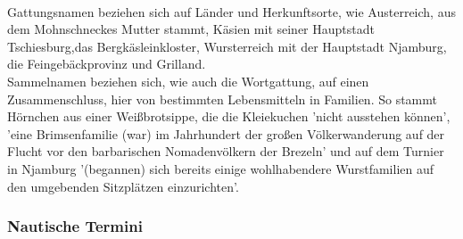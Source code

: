 \\
Gattungsnamen beziehen sich auf Länder und Herkunftsorte, wie Austerreich, aus dem Mohnschneckes Mutter stammt, \cite[S.13]{pir} Käsien \cite[S.140ff]{pir} mit seiner Hauptstadt Tschiesburg,\cite[S.164ff]{pir}das Bergkäsleinkloster,\cite[S.164]{pir} Wursterreich \cite[S.285ff]{pir} mit der Hauptstadt Njamburg, \cite[S.289]{pir}  die Feingebäckprovinz und \cite[S.325]{pir} Grilland. \cite[S.635]{pir} 
\\
Sammelnamen beziehen sich, wie auch die Wortgattung, auf einen Zusammenschluss, hier von bestimmten Lebensmitteln in Familien. So stammt Hörnchen aus einer Weißbrotsippe,\cite[S.538]{pir} die die Kleiekuchen \cite[S.538]{pir} 'nicht ausstehen können',\cite[S.538]{pir} 'eine Brimsenfamilie (war) im Jahrhundert der großen Völkerwanderung auf der Flucht vor den barbarischen Nomadenvölkern der Brezeln'\cite[S.165]{pir} und auf dem Turnier in Njamburg \cite[S.343ff]{pir}'(begannen) sich bereits einige wohlhabendere Wurstfamilien auf den umgebenden Sitzplätzen einzurichten'.\cite[S.345]{pir}


\subsubsection{Nautische Termini}

